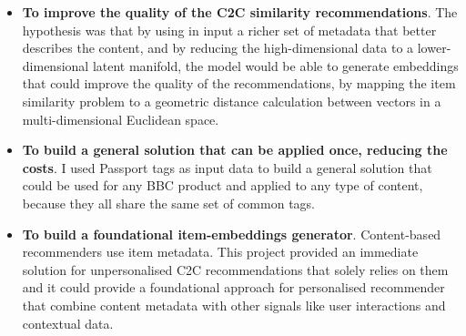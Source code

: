 \begin{itemize}
  \item \textbf{To improve the quality of the C2C similarity recommendations}. The hypothesis was that by using in input a richer set of metadata that
  better describes the content, and by reducing the high-dimensional data to a lower-dimensional latent manifold,
  the model would be able to generate embeddings that could improve the quality of the recommendations, by mapping the
  item similarity problem to a geometric distance calculation between vectors in a multi-dimensional Euclidean space.
  \item \textbf{To build a general solution that can be applied once, reducing the costs}. I used Passport tags as input data to build a general solution
  that could be used for any BBC product and applied to any type of content, because they all share the same set of common tags.
  \item \textbf{To build a foundational item-embeddings generator}. Content-based recommenders
  use item metadata. This project provided an immediate solution for unpersonalised C2C recommendations that solely relies on them and
  it could provide a foundational approach for personalised recommender that combine content metadata with other signals like user interactions
  and contextual data.
\end{itemize}
